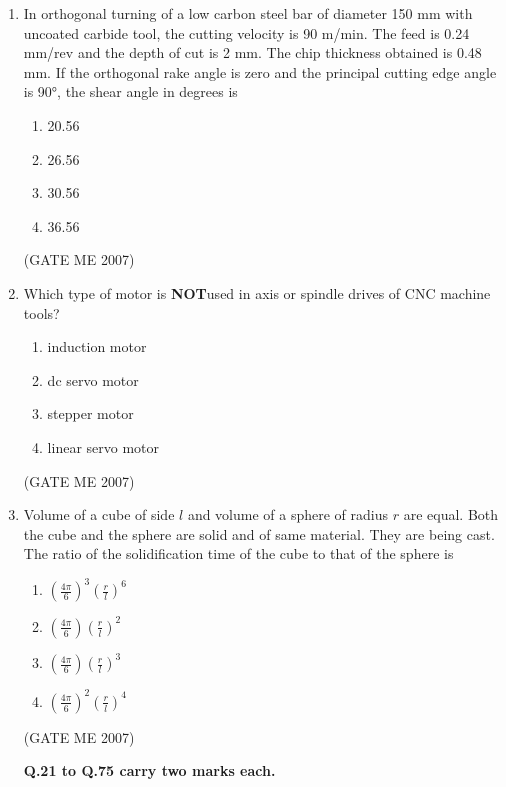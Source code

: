 \documentclass[journal]{IEEEtran}
\begin{document}
\begin{enumerate}
\item In orthogonal turning of a low carbon steel bar of diameter 150 mm with uncoated carbide tool, the cutting velocity is 90 m/min. The feed is 0.24 mm/rev and the depth of cut is 2 mm. The chip thickness obtained is 0.48 mm. If the orthogonal rake angle is zero and the principal cutting edge angle is 90°, the shear angle in degrees is
\begin{multicols}{4}
\begin{enumerate}
\item 20.56
\item 26.56
\item 30.56
\item 36.56
\end{enumerate}
\end{multicols}
\hfill (GATE ME 2007)

\item Which type of motor is \textbf{NOT}used in axis or spindle drives of CNC machine tools?
\begin{multicols}{2}
\begin{enumerate}
\item induction motor
\item dc servo motor
\item stepper motor
\item linear servo motor
\end{enumerate}
\end{multicols}
\hfill (GATE ME 2007)

\item Volume of a cube of side \( l \) and volume of a sphere of radius \( r \) are equal. Both the cube and the sphere are solid and of same material. They are being cast. The ratio of the solidification time of the cube to that of the sphere is
\begin{multicols}{4}
\begin{enumerate}
\item \( \left( \frac{4\pi}{6} \right)^3 \left( \frac{r}{l} \right)^6 \)
\item \( \left( \frac{4\pi}{6} \right) \left( \frac{r}{l} \right)^2 \)
\item \( \left( \frac{4\pi}{6} \right) \left( \frac{r}{l} \right)^3 \)
\item \( \left( \frac{4\pi}{6} \right)^2 \left( \frac{r}{l} \right)^4 \)
\end{enumerate}
\end{multicols}
\hfill (GATE ME 2007)

\begin{center}
\textbf{Q.21 to Q.75 carry two marks each.}
\end{center}


\end{enumerate}
\end{document}
